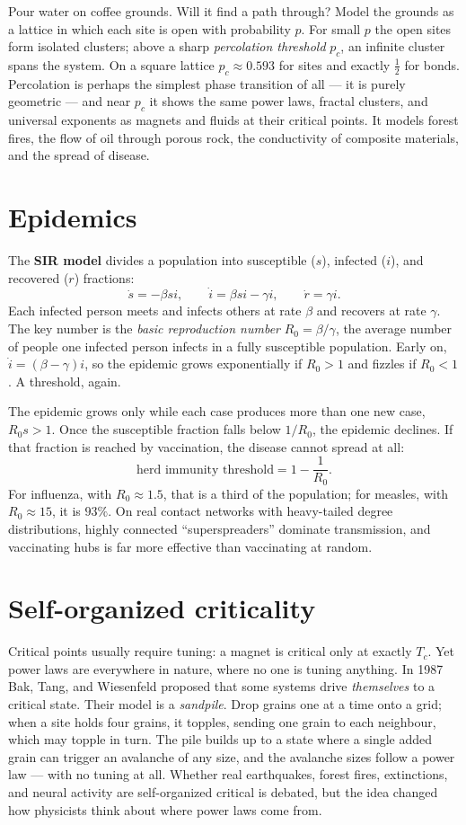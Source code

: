 Pour water on coffee grounds. Will it find a path through? Model the grounds as a lattice in which each site is open with probability $p$. For small $p$ the open sites form isolated clusters; above a sharp \emph{percolation threshold} $p_c$, an infinite cluster spans the system. On a square lattice $p_c\approx0.593$ for sites and exactly $\tfrac12$ for bonds. Percolation is perhaps the simplest phase transition of all --- it is purely geometric --- and near $p_c$ it shows the same power laws, fractal clusters, and universal exponents as magnets and fluids at their critical points. It models forest fires, the flow of oil through porous rock, the conductivity of composite materials, and the spread of disease.

\section{Epidemics}

The \textbf{SIR model} divides a population into susceptible ($s$), infected ($i$), and recovered ($r$) fractions:
\[
  \dot s = -\beta si,\qquad \dot i = \beta si - \gamma i,\qquad \dot r = \gamma i .
\]
Each infected person meets and infects others at rate $\beta$ and recovers at rate $\gamma$. The key number is the \emph{basic reproduction number} $R_0 = \beta/\gamma$, the average number of people one infected person infects in a fully susceptible population. Early on, $\dot i = (\beta - \gamma)i$, so the epidemic grows exponentially if $R_0>1$ and fizzles if $R_0<1$. A threshold, again.

The epidemic grows only while each case produces more than one new case, $R_0s>1$. Once the susceptible fraction falls below $1/R_0$, the epidemic declines. If that fraction is reached by vaccination, the disease cannot spread at all:
\[
  \text{herd immunity threshold} = 1 - \frac{1}{R_0}.
\]
For influenza, with $R_0\approx1.5$, that is a third of the population; for measles, with $R_0\approx15$, it is $93\%$. On real contact networks with heavy-tailed degree distributions, highly connected ``superspreaders'' dominate transmission, and vaccinating hubs is far more effective than vaccinating at random.

\section{Self-organized criticality}

Critical points usually require tuning: a magnet is critical only at exactly $T_c$. Yet power laws are everywhere in nature, where no one is tuning anything. In 1987 Bak, Tang, and Wiesenfeld proposed that some systems drive \emph{themselves} to a critical state. Their model is a \emph{sandpile}. Drop grains one at a time onto a grid; when a site holds four grains, it topples, sending one grain to each neighbour, which may topple in turn. The pile builds up to a state where a single added grain can trigger an avalanche of any size, and the avalanche sizes follow a power law --- with no tuning at all. Whether real earthquakes, forest fires, extinctions, and neural activity are self-organized critical is debated, but the idea changed how physicists think about where power laws come from.

